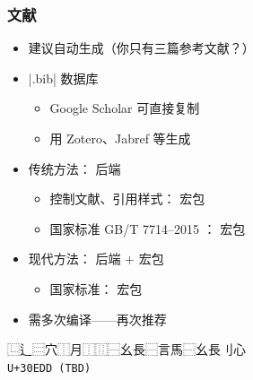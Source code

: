 \begin{frame}[fragile]
\frametitle{文献}
\begin{itemize}
  \item 建议自动生成\pause （你只有三篇参考文献？）\pause
  \item |.bib| 数据库

    \begin{itemize}
      \item Google Scholar 可直接复制
      \item 用 Zotero、Jabref 等生成
    \end{itemize} \pause

  \item 传统方法：\BibTeX{} 后端

    \begin{itemize}
      \item 控制文献、引用样式： 宏包
      \item 国家标准 GB/T 7714--2015
            ：
            \alert{ 宏包}
    \end{itemize} \pause

  \item 现代方法： 后端 +  宏包

    \begin{itemize}
      \item 国家标准： 宏包
    \end{itemize} \pause

  \item 需多次编译——再次推荐 
\end{itemize}
\end{frame}

\begin{frame}[standout]
  \begingroup
    \SourceHanSerifNoCJK\fontsize{72}{84}\selectfont
    ⿺辶⿳穴⿰月⿰⿲⿱幺長⿱言馬⿱幺長刂心
  \endgroup \\[2ex]
  \footnotesize \texttt{U+30EDD (TBD)}
\end{frame}

